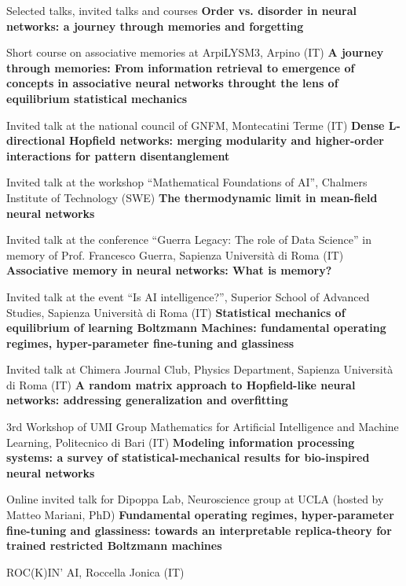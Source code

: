 \begin{rubric}{Selected talks, invited talks and courses}
\entry*[Nov 2026]
  \textbf{Order vs. disorder in neural networks: a journey through memories and forgetting}\par Short course on associative memories at ArpiLYSM3, Arpino (IT)
\entry*[Oct 2026]
  \textbf{A journey through memories: From information retrieval to emergence of concepts in associative neural networks throught the lens of equilibrium statistical mechanics}\par Invited talk at the national council of GNFM, Montecatini Terme (IT)
\entry*[Jun 2026]
  \textbf{Dense L-directional Hopfield networks: merging modularity and higher-order interactions for pattern disentanglement}\par Invited talk at the workshop ``Mathematical Foundations of AI'', Chalmers Institute of Technology (SWE)
\entry*[Jan 2026]
  \textbf{The thermodynamic limit in mean-field neural networks}\par Invited talk at the conference ``Guerra Legacy: The role of Data Science'' in memory of Prof. Francesco Guerra, Sapienza Università di Roma (IT)
\entry*[Sep 2025]
  \textbf{Associative memory in neural networks: What is memory?}\par Invited talk at the event ``Is AI intelligence?'', Superior School of Advanced Studies, Sapienza Università di Roma (IT)
\entry*[Apr 2025]
  \textbf{Statistical mechanics of equilibrium of learning Boltzmann Machines: fundamental operating regimes, hyper-parameter fine-tuning and glassiness}\par Invited talk at Chimera Journal Club, Physics Department, Sapienza Università di Roma (IT)
\entry*[Jan 2025]
  \textbf{A random matrix approach to Hopfield-like neural networks: addressing generalization and overfitting}\par 3rd Workshop of UMI Group Mathematics for Artificial Intelligence and Machine Learning, Politecnico di Bari (IT)
\entry*[Nov 2024]
  \textbf{Modeling information processing systems: a survey of statistical-mechanical results for bio-inspired neural networks}\par Online invited talk for Dipoppa Lab, Neuroscience group at UCLA (hosted by Matteo Mariani, PhD)
\entry*[Sep 2024]
  \textbf{Fundamental operating regimes, hyper-parameter fine-tuning and glassiness: towards an interpretable replica-theory for trained restricted Boltzmann machines}\par ROC(K)IN' AI, Roccella Jonica (IT)

\end{rubric}
